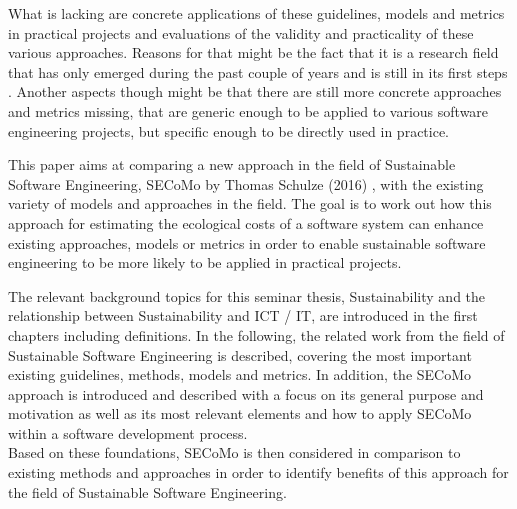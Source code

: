 What is lacking %
are %
concrete applications of these guidelines, models and metrics in practical projects %
and evaluations of the validity and practicality of these various approaches.
Reasons for that might be the %
fact that it is a research field that has only emerged during the past couple of years and is still in its first steps %
. Another aspects though might be that there are still more concrete approaches and metrics missing, that are generic enough to be applied to various software engineering projects, but specific enough to be directly used in practice.


This paper aims at comparing a new approach in the field of Sustainable Software Engineering, SECoMo by Thomas Schulze (2016) %
, with the existing variety of models and approaches in the field. The goal %
is to work out how this approach for estimating the ecological costs of a software system can enhance existing approaches, models or metrics %
in order to enable sustainable software engineering to be more likely to be applied in practical projects. %


The relevant background topics for this seminar thesis, Sustainability and the relationship %
between Sustainability and ICT / IT, %
are introduced in the first chapters including definitions. %
In the following, the related work from the field of Sustainable Software Engineering is described, covering the %
most important existing guidelines, methods, models and metrics. %
In addition, the SECoMo approach is introduced %
and described with a focus on its general purpose and motivation as well as its most relevant elements and how to apply SECoMo within a software development process. %
\\ Based on these foundations, SECoMo is then considered in comparison to %
existing methods and approaches in order to identify benefits of this approach for the field of Sustainable Software Engineering.




